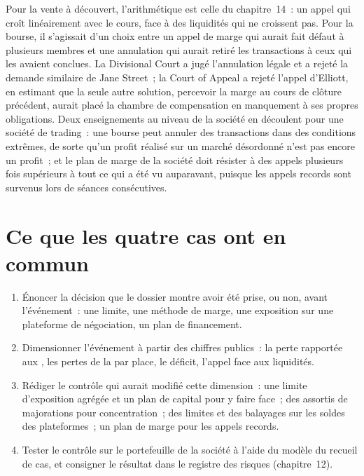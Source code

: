 Pour la vente à découvert, l'arithmétique est celle du chapitre~14~: un appel qui croît linéairement avec le cours, face à des liquidités qui ne croissent pas.
Pour la bourse, il s'agissait d'un choix entre un appel de marge qui aurait fait défaut à plusieurs membres et une annulation qui aurait retiré les transactions à ceux qui les avaient conclues.
La Divisional Court a jugé l'annulation légale et a rejeté la demande similaire de Jane Street~; la Court of Appeal a rejeté l'appel d'Elliott, en estimant que
la seule autre solution, percevoir la marge au cours de clôture précédent, aurait placé la chambre de compensation en manquement à ses propres obligations. Deux enseignements
au niveau de la société en découlent pour une société de trading~: une bourse peut annuler des transactions dans des conditions extrêmes, de sorte qu'un profit réalisé sur un marché désordonné n'est pas encore un profit~;
et le plan de marge de la société doit résister à des appels plusieurs fois supérieurs à tout ce qui a été vu auparavant, puisque les appels records sont survenus lors de séances consécutives.

\section{Ce que les quatre cas ont en commun}

\begin{method}\label{met:fm:case-studies-ii:control}
\begin{enumerate}
\item Énoncer la décision que le dossier montre avoir été prise, ou non, avant l'événement~: une limite, une méthode de marge, une exposition sur une plateforme de négociation, un plan de financement.
\item Dimensionner l'événement à partir des chiffres publics~: la perte rapportée aux , les pertes de la  par place, le déficit, l'appel face aux liquidités.
\item Rédiger le contrôle qui aurait modifié cette dimension~: une limite d'exposition agrégée et un plan de capital pour y faire face~; des  assortis de
majorations pour concentration~; des limites et des balayages sur les soldes des plateformes~; un plan de marge pour les appels records.
\item Tester le contrôle sur le portefeuille de la société à l'aide du modèle du recueil de cas, et consigner le résultat dans le registre des risques (chapitre~12).
\end{enumerate}
\end{method}

